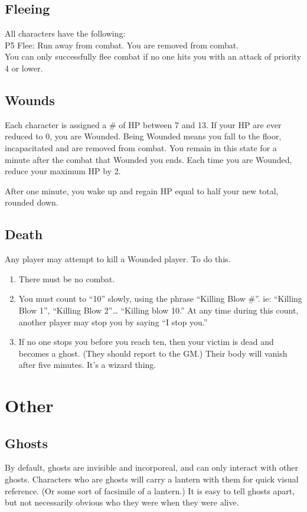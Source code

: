 \documentclass[blue]{Katmeers}
\begin{document}
\subsection*{Fleeing}
All characters have the following:\\
\indent P5 Flee: Run away from combat. You are removed from combat.\\
You can only successfully flee combat if no one hits you with an attack of priority 4 or lower.

\subsection*{Wounds}
Each character is assigned a \# of HP between 7 and 13. If your HP are ever reduced to 0, you are Wounded. Being Wounded means you fall to the floor, incapacitated and are removed from combat. You remain in this state for a minute after the combat that Wounded you ends. Each time you are Wounded, reduce your maximum HP by 2.

After one minute, you wake up and regain HP equal to half your new total, rounded down.

\subsection*{Death}
Any player may attempt to kill a Wounded player. To do this.
\begin{enumerate}
	\item There must be no combat.
	\item You must count to ``10'' slowly, using the phrase ``Killing Blow \#''. ie: ``Killing Blow 1'', ``Killing Blow 2''\ldots{} ``Killing blow 10.'' At any time during this count, another player may stop you by saying ``I stop you.''
	\item If no one stops you before you reach ten, then your victim is dead and becomes a ghost. (They should report to the GM.) Their body will vanish after five minutes.  It's a wizard thing.
\end{enumerate}

\section{Other}

\subsection*{Ghosts}
By default, ghosts are invisible and incorporeal, and can only interact with other ghosts.  Characters who are ghosts will carry a lantern with them for quick visual reference. (Or some sort of facsimile of a lantern.) It is easy to tell ghosts apart, but not necessarily obvious who they were when they were alive.
\end{document}
